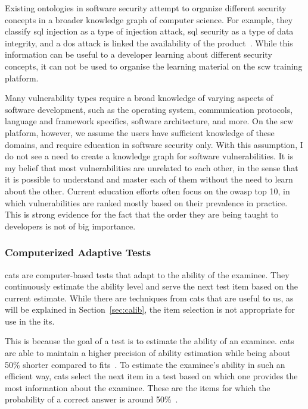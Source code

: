 Existing ontologies in software security attempt to organize different security concepts in a broader knowledge graph of computer science.
For example, they classify \gls{sql} injection as a type of injection attack, \gls{sql} security as a type of data integrity, and a \gls{dos} attack is linked the availability of the product~\cite{kang2013security, jia2018practical}.
While this information can be useful to a developer learning about different security concepts, it can not be used to organise the learning material on the \gls{scw} training platform.

Many vulnerability types require a broad knowledge of varying aspects of software development, such as the operating system, communication protocols, language and framework specifics, software architecture, and more.
On the \gls{scw} platform, however, we assume the users have sufficient knowledge of these domains, and require education in software security only.
With this assumption, I do not see a need to create a knowledge graph for software vulnerabilities.
It is my belief that most vulnerabilities are unrelated to each other, in the sense that it is possible to understand and master each of them without the need to learn about the other.
Current education efforts often focus on the \gls{owasp} top 10, in which vulnerabilities are ranked mostly based on their prevalence in practice.
This is strong evidence for the fact that the order they are being taught to developers is not of big importance.

\subsubsection{Computerized Adaptive Tests}
\Glspl{cat} are computer-based tests that adapt to the ability of the examinee. 
They continuously estimate the ability level and serve the next test item based on the current estimate.
While there are techniques from \glspl{cat} that are useful to us, as will be explained in Section~\ref{sec:calib}, the item selection is not appropriate for use in the \gls{its}.

This is because the goal of a test is to estimate the ability of an examinee. \Glspl{cat} are able to maintain a higher precision of ability estimation while being about 50\% shorter compared to \glspl{fit}~\cite{weiss1984application}.
To estimate the examinee's ability in such an efficient way, \glspl{cat} select the next item in a test based on which one provides the most information about the examinee. 
These are the items for which the probability of a correct answer is around 50\%~\cite{magis2017computerized, ling2017computerized}.

